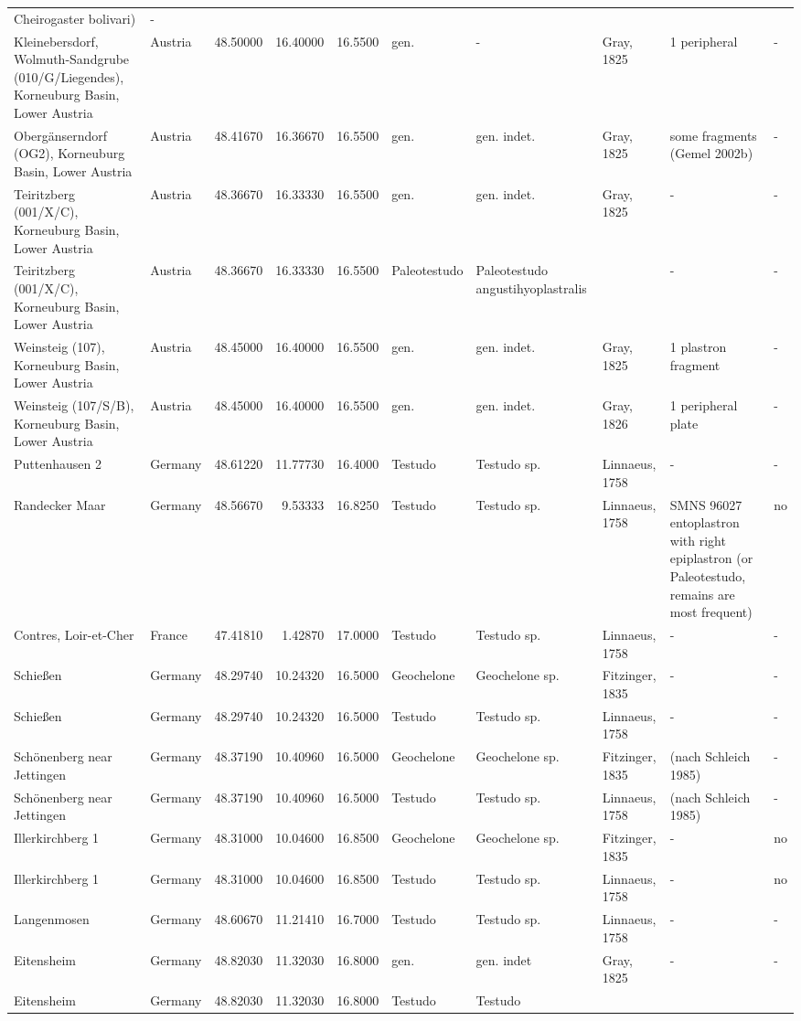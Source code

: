 \begin{landscape}
{\begin{longtable}[]{@{}llrrrlllll@{}}
Cheirogaster bolivari) & -\tabularnewline
Kleinebersdorf, Wolmuth-Sandgrube (010/G/Liegendes), Korneuburg Basin,
Lower Austria & Austria & 48.50000 & 16.40000 & 16.5500 & gen. & - &
Gray, 1825 & 1 peripheral & -\tabularnewline
Obergänserndorf (OG2), Korneuburg Basin, Lower Austria & Austria &
48.41670 & 16.36670 & 16.5500 & gen. & gen. indet. & Gray, 1825 & some
fragments (Gemel 2002b) & -\tabularnewline
Teiritzberg (001/X/C), Korneuburg Basin, Lower Austria & Austria &
48.36670 & 16.33330 & 16.5500 & gen. & gen. indet. & Gray, 1825 & - &
-\tabularnewline
Teiritzberg (001/X/C), Korneuburg Basin, Lower Austria & Austria &
48.36670 & 16.33330 & 16.5500 & Paleotestudo & Paleotestudo
angustihyoplastralis & & - & -\tabularnewline
Weinsteig (107), Korneuburg Basin, Lower Austria & Austria & 48.45000 &
16.40000 & 16.5500 & gen. & gen. indet. & Gray, 1825 & 1 plastron
fragment & -\tabularnewline
Weinsteig (107/S/B), Korneuburg Basin, Lower Austria & Austria &
48.45000 & 16.40000 & 16.5500 & gen. & gen. indet. & Gray, 1826 & 1
peripheral plate & -\tabularnewline
Puttenhausen 2 & Germany & 48.61220 & 11.77730 & 16.4000 & Testudo &
Testudo sp. & Linnaeus, 1758 & - & -\tabularnewline
Randecker Maar & Germany & 48.56670 & 9.53333 & 16.8250 & Testudo &
Testudo sp. & Linnaeus, 1758 & SMNS 96027 entoplastron with right
epiplastron (or Paleotestudo, remains are most frequent) &
no\tabularnewline
Contres, Loir-et-Cher & France & 47.41810 & 1.42870 & 17.0000 & Testudo
& Testudo sp. & Linnaeus, 1758 & - & -\tabularnewline
Schießen & Germany & 48.29740 & 10.24320 & 16.5000 & Geochelone &
Geochelone sp. & Fitzinger, 1835 & - & -\tabularnewline
Schießen & Germany & 48.29740 & 10.24320 & 16.5000 & Testudo & Testudo
sp. & Linnaeus, 1758 & - & -\tabularnewline
Schönenberg near Jettingen & Germany & 48.37190 & 10.40960 & 16.5000 &
Geochelone & Geochelone sp. & Fitzinger, 1835 & (nach Schleich 1985) &
-\tabularnewline
Schönenberg near Jettingen & Germany & 48.37190 & 10.40960 & 16.5000 &
Testudo & Testudo sp. & Linnaeus, 1758 & (nach Schleich 1985) &
-\tabularnewline
Illerkirchberg 1 & Germany & 48.31000 & 10.04600 & 16.8500 & Geochelone
& Geochelone sp. & Fitzinger, 1835 & - & no\tabularnewline
Illerkirchberg 1 & Germany & 48.31000 & 10.04600 & 16.8500 & Testudo &
Testudo sp. & Linnaeus, 1758 & - & no\tabularnewline
Langenmosen & Germany & 48.60670 & 11.21410 & 16.7000 & Testudo &
Testudo sp. & Linnaeus, 1758 & - & -\tabularnewline
Eitensheim & Germany & 48.82030 & 11.32030 & 16.8000 & gen. & gen. indet
& Gray, 1825 & - & -\tabularnewline
Eitensheim & Germany & 48.82030 & 11.32030 & 16.8000 & Testudo & Testudo

\end{longtable}}
\end{landscape}
